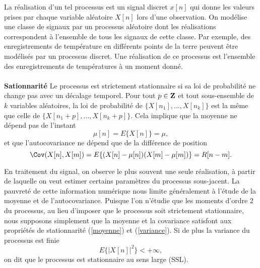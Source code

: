 La r\'ealisation d'un tel processus est un signal discret
$x[n]$ qui donne les valeurs prises par chaque
variable al\'eatoire $X[n]$ lors d'une observation.
On mod\'elise une classe de signaux par un processus al\'eatoire
dont les r\'ealisations correspondent \`a 
l'ensemble de tous les signaux de cette classe.
Par exemple, des enregistrements de temp\'erature en
diff\'erents points de la terre
peuvent \^etre mod\'elis\'es par un processus discret. 
Une r\'ealisation
de ce processus est l'ensemble des enregistrements de 
temp\'eratures \`a un moment donn\'e.
\\
\\
{\bf Sationnarit\'e}
Le processus est 
strictement stationnaire si 
sa loi de probabilit\'e ne change pas avec un d\'ecalage temporel.
Pour tout $p \in {\bf{Z}}$ et
tout sous-ensemble de 
$k$ variables al\'eatoires, la loi de probabilit\'e de
$\{X[{n_1}], ... , X[{n_k}] \}$ est la m\^eme que celle de
$\{X[{n_1}+p], ... , X[{n_k}+p] \}$. 
Cela implique que la moyenne ne d\'epend pas de
l'instant
\begin{equation}
\label{moyenne}
\mu[n] = E\{X[n]\} =  \mu ,
\end{equation}
et que l'autocovariance ne d\'epend que de la diff\'erence 
de position
\begin{equation}
\label{variance}
\Cov(X[n],X[m]) = E\{(X[n] - \mu[n]) ( X[m] -  \mu [m])\} = R[n-m] .
\end{equation}

En traitement du signal, 
on observe le plus souvent une seule
r\'ealisation, \`a partir de laquelle on
veut estimer certains param\`etres du processus sous-jacent.
La pauvret\'e de cette information num\'erique 
nous limite g\'en\'eralement 
\`a l'\'etude de la moyenne et de l'autocovariance.
Puisque l'on n'\'etudie que les moments d'ordre 2 du
processus, au lieu d'imposer que le processus soit strictement 
stationnaire, nous supposons simplement que la moyenne et
la covariance satisfont aux propri\'et\'es de stationnarit\'e
(\ref{moyenne}) et (\ref{variance}).
Si de plus la variance du processus est finie
\begin{equation}
\label{variance-finie}
E\{|X[n]|^2\}  < +\infty ,
\end{equation}
on dit que le processus est
stationnaire au sens large (SSL).\\
\\

